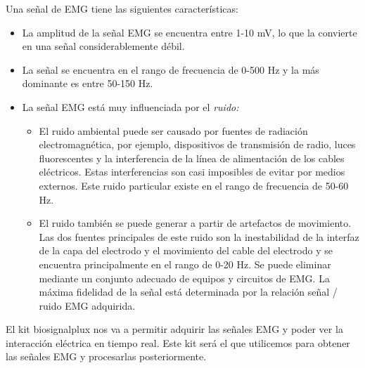 Una señal de EMG tiene las siguientes características:
\begin{itemize}
	\item La amplitud de la señal EMG se encuentra entre 1-10 mV, lo que la convierte en una señal considerablemente débil. 
	\item La señal se encuentra en el rango de frecuencia de 0-500 Hz y la más dominante es entre 50-150 Hz.
	\item La señal EMG está muy influenciada por el \textit{ruido:}\newline
	\begin{itemize}
		\item El ruido ambiental puede ser causado por fuentes de radiación electromagnética, por ejemplo, dispositivos de transmisión de radio, luces fluorescentes y la interferencia de la línea de alimentación de los cables eléctricos. Estas interferencias son casi imposibles de evitar por medios externos. Este ruido particular 			existe en el rango de frecuencia de 50-60 Hz. \newline
		\item El ruido también se puede generar a partir de artefactos de movimiento. Las dos fuentes principales de este ruido son la inestabilidad de la interfaz de la capa del electrodo y el movimiento del cable del electrodo y se encuentra principalmente en el rango de 0-20 Hz. Se puede eliminar mediante un conjunto 					adecuado de equipos y circuitos de EMG. La máxima fidelidad de la señal está determinada por la relación señal / ruido EMG adquirida. \newline
	\end{itemize}
\end{itemize}

El kit biosignalplux nos va a permitir adquirir las señales EMG y poder ver la interacción eléctrica en tiempo real. Este kit será el que utilicemos para obtener las señales EMG y procesarlas posteriormente.




